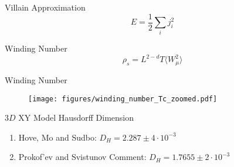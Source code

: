 \documentclass[10pt]{beamer}
\begin{document}
\begin{frame}{Villain Approximation}
    \begin{equation*}
        E = \frac{1}{2} \sum_i j_i^2
    \end{equation*}
\end{frame}


\begin{frame}{Winding Number}
    \begin{equation*}
        \rho_s = L^{2 - d} T \langle W_\mu^2 \rangle 
    \end{equation*}
\end{frame}

\begin{frame}{Winding Number}
    \begin{figure}[h!]
        \centering
            \texttt{[image: figures/winding\_number\_Tc\_zoomed.pdf]}
    \end{figure}
\end{frame}

\begin{frame}{$3D$ XY Model Hausdorff Dimension}
    \begin{enumerate}[$\bullet$]
        \item Hove, Mo and Sudbo: $D_H = 2.287 \pm 4 \cdot 10^{-3}$
        \item Prokof'ev and Svistunov Comment: $D_H = 1.7655 \pm 2 \cdot 10^{-3}$
    \end{enumerate}
\end{frame}
\end{document}
